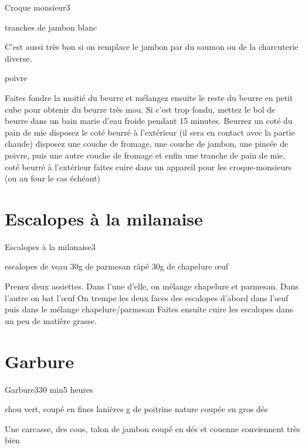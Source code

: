 {\begin{recette}{Croque monsieur}{3}{}{}
\begin{ingredients}
 tranches de jambon blanc
\begin{remarque}
C'est aussi très bon si on remplace le jambon par du saumon ou de la charcuterie diverse.
\end{remarque}

\ingredient poivre
\end{ingredients}

\begin{preparation}
\etape Faites fondre la moitié du beurre et mélangez ensuite le reste du beurre en petit cube pour obtenir du beurre très mou. Si c'est trop fondu, mettez le bol de beurre dans un bain marie d'eau froide pendant 15 minutes.
\etape Beurrez un coté du pain de mie
\etape disposez le coté beurré à l'extérieur (il sera en contact avec la partie chaude)
\etape disposez une couche de fromage, une couche de jambon, une pincée de poivre, puis une autre couche de fromage et enfin une 
tranche de pain de mie, coté beurré à l'extérieur
\etape faites cuire dans un appareil pour les croque-monsieurs (ou au four le cas échéant)
\end{preparation}
\end{recette}

\section{Escalopes à la milanaise}
\begin{recette}{Escalopes à la milanaise}{3}{}{}
\begin{ingredients}
 escalopes de veau
\ingredient 30g de parmesan râpé
\ingredient 30g de chapelure
 œuf
\end{ingredients}

\begin{preparation}
\etape Prenez deux assiettes. Dans l'une d'elle, on mélange chapelure et parmesan. Dans l'autre on bat l'œuf
\etape On trempe les deux faces des escalopes d'abord dans l'œuf puis dans le mélange chapelure/parmesan
\etape Faites ensuite cuire les escalopes dans un peu de matière grasse.
\end{preparation}
\end{recette}


\section{Garbure}
\begin{recette}{Garbure}{3}{30 min}{5 heures}
\begin{ingredients}
 chou vert, coupé en fines lanières
 g de poitrine nature coupée en gros dés
\begin{remarque}
Une carcasse, des cous, talon de jambon coupé en dés et couenne conviennent très bien
\end{remarque}


\end{ingredients}
\end{recette}}
